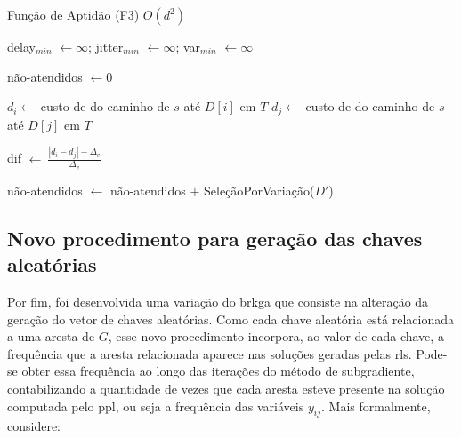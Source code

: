 \begin{algorithm}[!ht]
  \caption{Função de Aptidão (F3) $O(d^2)$ \label{alg:f3}}
  
  delay$_{min}$ $\leftarrow \infty$;
  jitter$_{min}$ $\leftarrow \infty$;
  var$_{min}$ $\leftarrow \infty$\;
  
  não-atendidos $\leftarrow 0$\;

   \label{line:for-f3-end}

   {
     {
      $d_{i} \leftarrow$ custo de {\delay} do caminho de $s$ até $D[i]$ em $T$\;
      $d_{j} \leftarrow$ custo de {\delay} do caminho de $s$ até $D[j]$ em $T$\;
    
       {
        dif $\leftarrow \ \frac{|d_i - d_j| - \Delta_v}{\Delta_v}$\;

      }
    }
  }
 
  não-atendidos $\leftarrow$ não-atendidos $+$ SeleçãoPorVariação($D'$)\;

  \; \label{line:return-f3}
\end{algorithm}

\newpage
\subsection{Novo procedimento para geração das chaves aleatórias} \label{subsec:brkga-rl}

Por fim, foi desenvolvida uma variação  do \gls{brkga} que consiste na alteração
da  geração do  vetor  de  chaves aleatórias.  Como  cada  chave aleatória  está
relacionada a uma  aresta de $G$, esse novo procedimento  incorpora, ao valor de
cada chave, a  frequência que a aresta relacionada aparece  nas soluções geradas
pelas \gls{rl}s. Pode-se obter essa frequência  ao longo das iterações do método
de subgradiente,  contabilizando a  quantidade de vezes  que cada  aresta esteve
presente na solução computada pelo \gls{ppl}, ou seja a frequência das variáveis
$y_{ij}$. Mais formalmente, considere:

